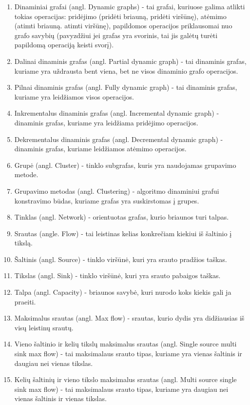 \begin{enumerate}
	\item Dinaminiai grafai (angl. Dynamic graphs) - tai grafai, kuriuose galima atlikti tokias operacijas: pridėjimo (pridėti briauną, pridėti viršūnę), atėmimo (atimti briauną. atimti viršūnę), papildomos operacijos priklausomai nuo grafo savybių (pavyzdžiui jei grafas yra svorinis, tai jis galėtų turėti papildomą operaciją keisti svorį).
	\item Dalinai dinaminis grafas (angl. Partial dynamic graph) - tai dinaminis grafas, kuriame yra uždrausta bent viena, bet ne visos dinaminio grafo operacijos.
	\item Pilnai dinaminis grafas (angl. Fully dynamic graph) - tai dinaminis grafas, kuriame yra leidžiamos visos operacijos.
	\item Inkrementalus dinaminis grafas (angl. Incremental dynamic graph) - dinaminis grafas, kuriame yra leidžiama pridėjimo operacijos.
	\item Dekrementalus dinaminis grafas (angl. Decremental dynamic graph) - dinaminis grafas, kuriame leidžiamos atėmimo operacijos.
	\item Grupė (angl. Cluster) - tinklo subgrafas, kuris yra naudojamas grupavimo metode.
	\item Grupavimo metodas (angl. Clustering) - algoritmo dinaminiui grafui konstravimo būdas, kuriame grafas yra suskirstomas į grupes.
	\item Tinklas (angl. Network) - orientuotas grafas, kurio briaunos turi talpas.
	\item Srautas (angle. Flow) - tai leistinas kelias konkrečiam kiekiui iš šaltinio į tikslą.
	\item Šaltinis (angl. Source) - tinklo viršūnė, kuri yra srauto pradžios taškas.
	\item Tikslas (angl. Sink) - tinklo viršūnė, kuri yra srauto pabaigos taškas.
	\item Talpa (angl. Capacity) - briaunos savybė, kuri nurodo koks kiekis gali ja praeiti.
	\item  Maksimalus srautas (angl. Max flow) - srautas, kurio dydis yra didžiausias iš visų leistinų srautų.
	\item Vieno šaltinio ir kelių tikslų maksimalus srautas (angl. Single source multi sink max flow) - tai maksimalaus srauto tipas, kuriame yra vienas šaltinis ir daugiau nei vienas tikslas.
	\item Kelių šaltinių ir vieno tikslo maksimalus srautas (angl. Multi source single sink max flow) - tai maksimalaus srauto tipas, kuriame yra daugiau nei vienas šaltinis ir vienas tikslas.

\end{enumerate}
